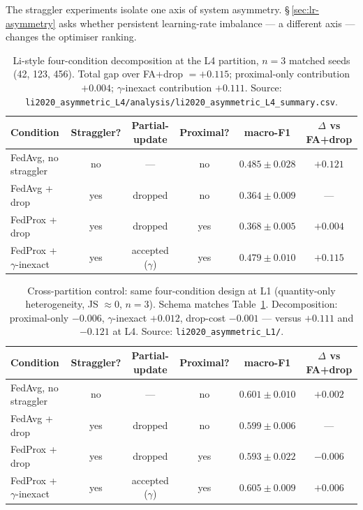 The straggler experiments isolate one axis of system asymmetry.
\S\,\ref{sec:lr-asymmetry} asks whether persistent learning-rate imbalance
--- a different axis --- changes the optimiser ranking.



\begin{table}[h]
\centering
\caption{Li-style four-condition decomposition at the L4 partition,
$n=3$ matched seeds (42, 123, 456). Total gap over FA+drop $= +0.115$;
proximal-only contribution $+0.004$; $\gamma$-inexact contribution $+0.111$.
Source: \texttt{li2020\_asymmetric\_L4/analysis/li2020\_asymmetric\_L4\_summary.csv}.}
\label{tab:li-decomp-l4}
\begin{tabular}{lccccc}
\hline
Condition & Straggler? & Partial-update & Proximal? & macro-F1 & $\Delta$ vs FA+drop \\
\hline
FedAvg, no straggler        & no  & ---                  & no  & $0.485 \pm 0.028$ & $+0.121$ \\
FedAvg + drop               & yes & dropped              & no  & $0.364 \pm 0.009$ & ---      \\
FedProx + drop              & yes & dropped              & yes & $0.368 \pm 0.005$ & $+0.004$ \\
FedProx + $\gamma$-inexact  & yes & accepted ($\gamma$)  & yes & $0.479 \pm 0.010$ & $+0.115$ \\
\hline
\end{tabular}
\end{table}

\begin{table}[h]
\centering
\caption{Cross-partition control: same four-condition design at L1
(quantity-only heterogeneity, JS $\approx 0$, $n=3$). Schema matches
Table~\ref{tab:li-decomp-l4}. Decomposition: proximal-only $-0.006$,
$\gamma$-inexact $+0.012$, drop-cost $-0.001$ --- versus $+0.111$ and
$-0.121$ at L4. Source: \texttt{li2020\_asymmetric\_L1/}.}
\label{tab:li-decomp-l1}
\begin{tabular}{lccccc}
\hline
Condition & Straggler? & Partial-update & Proximal? & macro-F1 & $\Delta$ vs FA+drop \\
\hline
FedAvg, no straggler        & no  & ---                  & no  & $0.601 \pm 0.010$ & $+0.002$ \\
FedAvg + drop               & yes & dropped              & no  & $0.599 \pm 0.006$ & ---      \\
FedProx + drop              & yes & dropped              & yes & $0.593 \pm 0.022$ & $-0.006$ \\
FedProx + $\gamma$-inexact  & yes & accepted ($\gamma$)  & yes & $0.605 \pm 0.009$ & $+0.006$ \\
\hline
\end{tabular}
\end{table}


